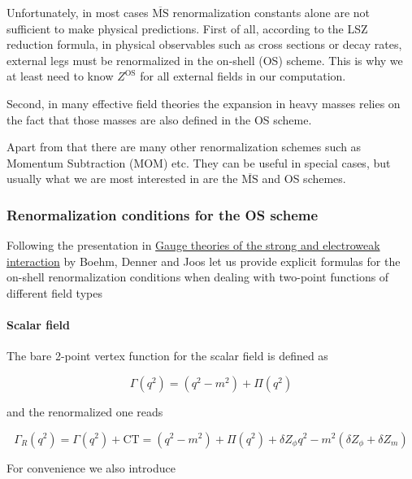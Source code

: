 \documentclass[../FeynCalcManual.tex]{subfiles}
\begin{document}
Unfortunately, in most cases \(\overline{\textrm{MS}}\) renormalization
constants alone are not sufficient to make physical predictions. First
of all, according to the LSZ reduction formula, in physical observables
such as cross sections or decay rates, external legs must be
renormalized in the on-shell (OS) scheme. This is why we at least need
to know \(Z^{\textrm{OS}}\) for all external fields in our computation.

Second, in many effective field theories the expansion in heavy masses
relies on the fact that those masses are also defined in the OS scheme.

Apart from that there are many other renormalization schemes such as
Momentum Subtraction (MOM) etc. They can be useful in special cases, but
usually what we are most interested in are the
\(\overline{\textrm{MS}}\) and OS schemes.

\hypertarget{renormalization-conditions-for-the-os-scheme}{%
\subsubsection{Renormalization conditions for the OS
scheme}\label{renormalization-conditions-for-the-os-scheme}}

Following the presentation in
\href{https://inspirehep.net/literature/571258}{Gauge theories of the
strong and electroweak interaction} by Boehm, Denner and Joos let us
provide explicit formulas for the on-shell renormalization conditions
when dealing with two-point functions of different field types

\hypertarget{scalar-field}{%
\paragraph{Scalar field}\label{scalar-field}}

The bare 2-point vertex function for the scalar field is defined as

\begin{equation}
\Gamma(q^2) = (q^2 - m^2) + \Pi(q^2)
\end{equation}

and the renormalized one reads

\begin{equation}
\Gamma_R(q^2) = \Gamma(q^2) + \textrm{CT} = (q^2 - m^2) + \Pi(q^2) + \delta Z_{\phi} q^2 - m^2 (\delta Z_{\phi} + \delta Z_{m}   )
\end{equation}

For convenience we also introduce
\end{document}
